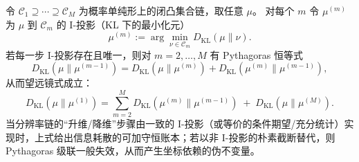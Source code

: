 \begin{remark}\label{rem:pom-kl-ledger-telescope-i-projection}
令 \(\mathcal C_1\supseteq \cdots \supseteq \mathcal C_M\) 为概率单纯形上的闭凸集合链，取任意 \(\mu\)。
对每个 \(m\) 令 \(\mu^{(m)}\) 为 \(\mu\) 到 \(\mathcal C_m\) 的 I-投影（KL 下的最小化元）
\[
\mu^{(m)}:=\arg\min_{\nu\in\mathcal C_m}D_{\mathrm{KL}}(\mu\|\nu).
\]
若每一步 I-投影存在且唯一，则对 \(m=2,\dots,M\) 有 Pythagoras 恒等式
\[
D_{\mathrm{KL}}(\mu\|\mu^{(m-1)})
=D_{\mathrm{KL}}(\mu\|\mu^{(m)})+D_{\mathrm{KL}}(\mu^{(m)}\|\mu^{(m-1)}),
\]
从而望远镜式成立：
\[
D_{\mathrm{KL}}(\mu\|\mu^{(1)})
=\sum_{m=2}^{M}D_{\mathrm{KL}}(\mu^{(m)}\|\mu^{(m-1)})\;+\;D_{\mathrm{KL}}(\mu\|\mu^{(M)}).
\]
当分辨率链的“升维/降维”步骤由一致的 I-投影（或等价的条件期望/充分统计）实现时，上式给出信息耗散的可加守恒账本；若以非 I-投影的朴素截断替代，则 Pythagoras 级联一般失效，从而产生坐标依赖的伪不变量。
\end{remark}

\endinput
